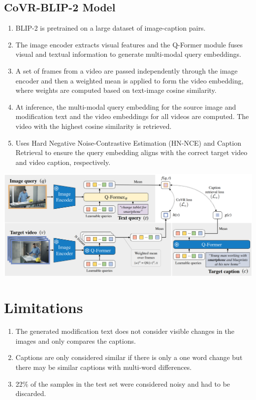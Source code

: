 \documentclass{article}
\begin{document}
\subsection*{CoVR-BLIP-2 Model}
\begin{enumerate}
    \item BLIP-2 is pretrained on a large dataset of image-caption pairs.
    \item The image encoder extracts visual features and the Q-Former module fuses visual and textual information to generate multi-modal query embeddings.
    \item A set of frames from a video are passed independently through the image encoder and then a weighted mean is applied to form the video embedding, where weights are computed based on text-image cosine similarity.
    \item At inference, the multi-modal query embedding for the source image and modification text and the video embeddings for all videos are computed. The video with the highest cosine similarity is retrieved.
    \item Uses Hard Negative Noise-Contrastive Estimation (HN-NCE) and Caption Retrieval to ensure the query embedding aligns with the correct target video and video caption, respectively.
\end{enumerate}

\begin{center}
    \includegraphics[scale=0.2]{covr2-3.png}
\end{center}

\section*{Limitations}
\begin{enumerate}
    \item The generated modification text does not consider visible changes in the images and only compares the captions.
    \item Captions are only considered similar if there is only a one word change but there may be similar captions with multi-word differences.
    \item 22\% of the samples in the test set were considered noisy and had to be discarded.
\end{enumerate}
\end{document}
